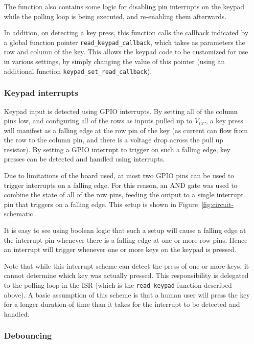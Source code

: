 \documentclass[11pt,a4paper,twocolumn]{scrartcl}
\begin{document}
The function also contains some logic for disabling pin interrupts on the keypad while the polling loop is being executed, and re-enabling them afterwards. 

In addition, on detecting a key press, this function calls the callback indicated by a global function pointer \verb!read_keypad_callback!, which takes as parameters the row and column of the key. This allows the keypad code to be customized for use in various settings, by simply changing the value of this pointer (using an additional function \verb!keypad_set_read_callback!).

\subsubsection{Keypad interrupts}

Keypad input is detected using GPIO interrupts. By setting all of the column pins low, and configuring all of the rows as inputs pulled up to $V_{CC}$, a key press will manifest as a falling edge at the row pin of the key (as current can flow from the row to the column pin, and there is a voltage drop across the pull up resistor). By setting a GPIO interrupt to trigger on such a falling edge, key presses can be detected and handled using interrupts.

Due to limitations of the board used, at most two GPIO pins can be used to trigger interrupts on a falling edge. For this reason, an AND gate was used to combine the state of all of the row pins, feeding the output to a single interrupt pin that triggers on a falling edge. This setup is shown in Figure~\ref{fig:circuit-schematic}. 

It is easy to see using boolean logic that such a setup will cause a falling edge at the interrupt pin whenever there is a falling edge at one or more row pins. Hence an interrupt will trigger whenever one or more keys on the keypad is pressed.

Note that while this interrupt scheme can detect the press of one or more keys, it cannot determine which key was actually pressed. This responsibility is delegated to the polling loop in the ISR (which is the \verb!read_keypad! function described above). A basic assumption of this scheme is that a human user will press the key for a longer duration of time than it takes for the interrupt to be detected and handled.

\subsubsection{Debouncing}
\end{document}
